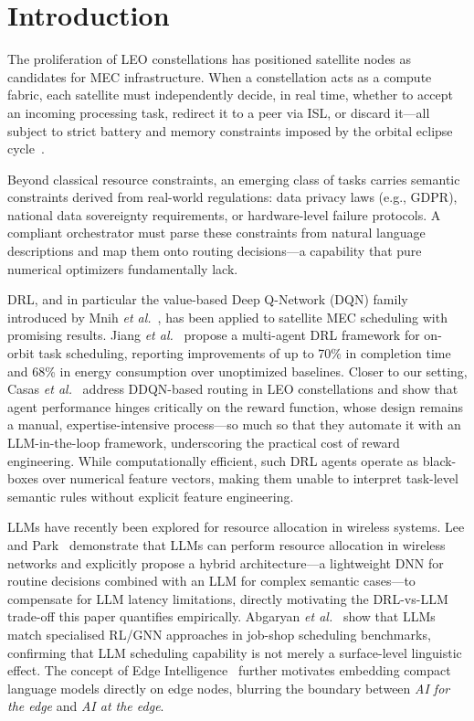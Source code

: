 \documentclass[conference,comsoc,twoside,caption=false]{IEEEtran}
\theoremstyle{definition}
\begin{document}
\section{Introduction}
\label{sec:intro}

The proliferation of \ac{LEO} constellations has positioned satellite nodes
as candidates for \ac{MEC} infrastructure. When a constellation acts as a
compute fabric, each satellite must independently decide, in real time, whether
to accept an incoming processing task, redirect it to a peer via \ac{ISL}, or
discard it---all subject to strict battery and memory constraints imposed by the
orbital eclipse cycle~\cite{guo2024,gpp2022}.

Beyond classical resource constraints, an emerging class of tasks carries
semantic constraints derived from real-world regulations: data privacy laws
(e.g., \ac{GDPR}), national data sovereignty requirements, or hardware-level failure
protocols. A compliant orchestrator must parse these constraints from natural
language descriptions and map them onto routing decisions---a capability that
pure numerical optimizers fundamentally lack.

\ac{DRL}, and in particular the value-based Deep Q-Network (DQN) family
introduced by Mnih \emph{et al.}~\cite{mnih2015}, has been applied to satellite
MEC scheduling with promising results. Jiang \emph{et al.}~\cite{jiang2025}
propose a multi-agent DRL framework for on-orbit task scheduling, reporting
improvements of up to 70\% in completion time and 68\% in energy consumption
over unoptimized baselines. Closer to our setting, Casas \emph{et al.}~\cite{casas2026}
address DDQN-based routing in \ac{LEO} constellations and show that agent
performance hinges critically on the reward function, whose design remains a
manual, expertise-intensive process---so much so that they automate it with an
LLM-in-the-loop framework, underscoring the practical cost of reward
engineering. While computationally efficient, such DRL agents operate as
black-boxes over numerical feature vectors, making them unable to interpret
task-level semantic rules without explicit feature engineering.

\acp{LLM} have recently been explored for resource allocation in wireless
systems. Lee and Park~\cite{lee2024} demonstrate that LLMs can perform resource
allocation in wireless networks and explicitly propose a hybrid architecture---a
lightweight DNN for routine decisions combined with an LLM for complex semantic
cases---to compensate for LLM latency limitations, directly motivating the
DRL-vs-LLM trade-off this paper quantifies empirically. Abgaryan
\emph{et al.}~\cite{abgaryan2024} show that LLMs match specialised RL/GNN
approaches in job-shop scheduling benchmarks, confirming that LLM scheduling
capability is not merely a surface-level linguistic effect. The concept of
Edge Intelligence~\cite{deng2020} further motivates embedding compact language
models directly on edge nodes, blurring the boundary between \emph{AI for the
edge} and \emph{AI at the edge}.
\end{document}
